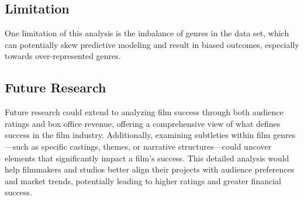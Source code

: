 \documentclass[
  11pt,
]{article}
\begin{document}
\hypertarget{limitation}{%
\subsection{Limitation}\label{limitation}}

One limitation of this analysis is the imbalance of genres in the data
set, which can potentially skew predictive modeling and result in biased
outcomes, especially towards over-represented genres.

\hypertarget{future-research}{%
\subsection{Future Research}\label{future-research}}

Future research could extend to analyzing film success through both
audience ratings and box office revenue, offering a comprehensive view
of what defines success in the film industry. Additionally, examining
subtleties within film genres---such as specific castings, themes, or
narrative structures---could uncover elements that significantly impact
a film's success. This detailed analysis would help filmmakers and
studios better align their projects with audience preferences and market
trends, potentially leading to higher ratings and greater financial
success.
\end{document}
